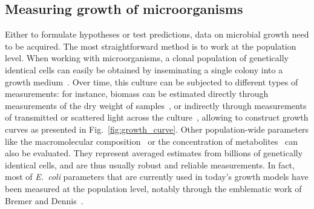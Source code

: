 

\subsection{Measuring growth of microorganisms}

Either to formulate hypotheses or test predictions, data on microbial growth need to be acquired.
The most straightforward method is to work at the population level.
When working with microorganisms, a clonal population of genetically identical cells can easily be obtained by inseminating a single colony into a growth medium~\cite{schaechter_microbe_2006}.
Over time, this culture can be subjected to different types of measurements: for instance, biomass can be estimated  directly through measurements of the dry weight of samples~\cite{monod_growth_1949}, or indirectly through measurements of transmitted or scattered light across the culture~\cite{volkmer_condition-dependent_2011}, allowing to construct growth curves as presented in Fig.~\ref{fig:growth_curve}.
Other population-wide parameters like the macromolecular composition~\cite{scott_interdependence_2010,scott_bacterial_2011} or the concentration of metabolites~\cite{bennett_absolute_2009} can also be evaluated.
They represent averaged estimates from billions of genetically identical cells, and are thus usually robust and reliable measurements.
In fact, most of \textit{E.~coli} parameters that are currently used in today's growth models have been measured at the population level, notably through the emblematic work of Bremer and Dennis~\cite{churchward_macromolecular_1982,bremer_modulation_1996,bremer_free_2003,bremer_feedback_2008}.

